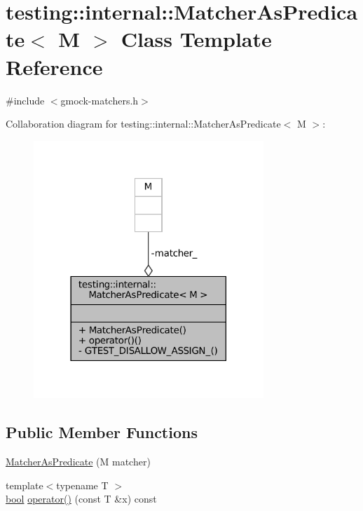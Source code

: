 \hypertarget{classtesting_1_1internal_1_1MatcherAsPredicate}{}\section{testing\+:\+:internal\+:\+:Matcher\+As\+Predicate$<$ M $>$ Class Template Reference}
\label{classtesting_1_1internal_1_1MatcherAsPredicate}


{\ttfamily \#include $<$gmock-\/matchers.\+h$>$}



Collaboration diagram for testing\+:\+:internal\+:\+:Matcher\+As\+Predicate$<$ M $>$\+:
\nopagebreak
\begin{figure}[H]
\begin{center}
\leavevmode
\includegraphics[width=246pt]{classtesting_1_1internal_1_1MatcherAsPredicate__coll__graph}
\end{center}
\end{figure}
\subsection*{Public Member Functions}
\begin{DoxyCompactItemize}
\item 
\hyperlink{classtesting_1_1internal_1_1MatcherAsPredicate_a2d8ad258929496dd3dea00fdb8ce3c8a}{Matcher\+As\+Predicate} (M matcher)
\item 
{\footnotesize template$<$typename T $>$ }\\\hyperlink{classbool}{bool} \hyperlink{classtesting_1_1internal_1_1MatcherAsPredicate_ab4594a16ff5cdfd07acb5017b7aa54f3}{operator()} (const T \&x) const
\end{DoxyCompactItemize}
